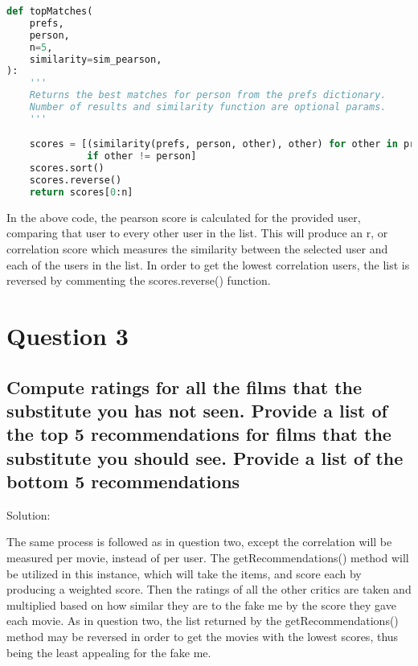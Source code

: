 \documentclass[11pt]{scrartcl} %
\begin{document}
\begin{lstlisting}[language = Python, caption=Getting User Objects]
def topMatches(
    prefs,
    person,
    n=5,
    similarity=sim_pearson,
):
    '''
    Returns the best matches for person from the prefs dictionary. 
    Number of results and similarity function are optional params.
    '''

    scores = [(similarity(prefs, person, other), other) for other in prefs
              if other != person]
    scores.sort()
    scores.reverse()
    return scores[0:n]
\end{lstlisting} \bigskip 

\tabto{2.0cm} In the above code, the pearson score is calculated for the provided user, comparing that user to every other user in the list. This will produce an r, or correlation score which measures the similarity between the selected user and each of the users in the list. In order to get the lowest correlation users, the list is reversed by commenting the scores.reverse() function.

\pagebreak

\section*{Question 3}


\subsection*{Compute ratings for all the films that the substitute you
has not seen.  Provide a list of the top 5 recommendations for films
that the substitute you should see.  Provide a list of the bottom
5 recommendations}

\bigskip\bigskip
\LARGE Solution: \newline\newline\small

\tabto{2.0 cm} The same process is followed as in question two, except the correlation will be measured per movie, instead of per user. The getRecommendations() method will be utilized in this instance, which will take the items, and score each by producing a weighted score. Then the ratings of all the other critics are taken and multiplied based on how similar they are to the fake me by the score they gave each movie. As in question two, the list returned by the getRecommendations() method may be reversed in order to get the movies with the lowest scores, thus being the least appealing for the fake me.
\end{document}
